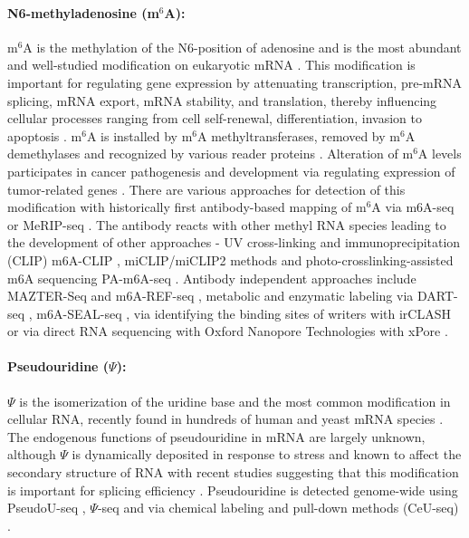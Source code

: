 \paragraph{N6-methyladenosine (m$^6$A):} m$^6$A is the methylation of the N6-position of adenosine and is the most abundant and well-studied modification on eukaryotic mRNA \citep{Dominissini2012,Meyer2012}. This modification is important for regulating gene expression by attenuating  transcription, pre-mRNA splicing, mRNA export, mRNA stability, and translation, thereby influencing cellular processes ranging from cell self-renewal, differentiation, invasion to apoptosis \citep{He2019,Nachtergaele2018}. m$^6$A is installed by m$^6$A methyltransferases, removed by m$^6$A demethylases and recognized by various reader proteins \citep{Zaccara2019}. Alteration of m$^6$A levels participates in cancer pathogenesis and development via regulating expression of tumor-related genes \citep{Luo2018,Chang2019,He2019}. There are various approaches for detection of this modification with historically first antibody-based mapping of m$^6$A via m6A-seq \citep{Dominissini2012} or MeRIP-seq \citep{Meyer2012}. The antibody reacts with other methyl RNA species \citep{Linder2015,Mauer2017} leading to the development of other approaches -  UV cross-linking and immunoprecipitation (CLIP) m6A-CLIP \citep{Ke2015},  miCLIP/miCLIP2 methods \citep{Linder2015,Geula2015,Koertel2021} and photo-crosslinking-assisted m6A sequencing PA-m6A-seq \citep{Chen2015}. Antibody independent approaches include MAZTER-Seq \citep{GarciaCampos2019} and m6A-REF-seq \citep{Chen2022}, metabolic and enzymatic labeling via DART-seq \citep{Meyer2019}, m6A-SEAL-seq \citep{Wang2020}, via identifying the binding sites of writers with irCLASH \citep{Song2020} or via direct RNA sequencing with Oxford Nanopore Technologies with xPore \citep{Pratanwanich2021}.
  
\paragraph{Pseudouridine ($\Psi$):} $\Psi$ is the isomerization of the uridine base and the most common modification in cellular RNA, recently found in hundreds of human and yeast mRNA species \citep{Carlile2014}.  The endogenous functions of pseudouridine in mRNA are largely unknown, although $\Psi$ is dynamically deposited in response to stress and known to affect the secondary structure of RNA with recent studies suggesting that this modification is important for splicing efficiency \citep{Martinez2022}. Pseudouridine is detected genome-wide using PseudoU-seq \citep{Carlile2014}, $\Psi$-seq \citep{Schwartz2014} and via chemical labeling and pull-down methods (CeU-seq) \citep{Li2015}. 

